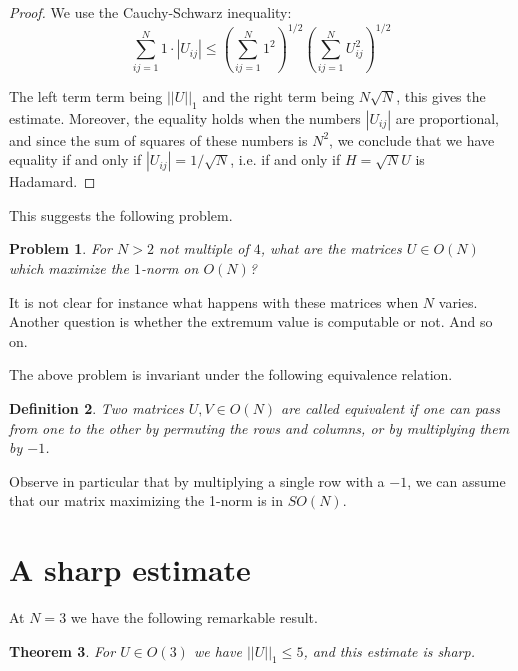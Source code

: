 \documentclass[12pt]{amsart}
\newtheorem{theorem}{Theorem}[section]
\newtheorem{definition}[theorem]{Definition}
\newtheorem{problem}[theorem]{Problem}
\begin{document}
\begin{proof}
We use the Cauchy-Schwarz inequality:
$$\sum_{ij=1}^N1\cdot |U_{ij}|\leq\left(\sum_{ij=1}^N1^2\right)^{1/2}\left(\sum_{ij=1}^NU_{ij}^2\right)^{1/2}$$

The left term term being $||U||_1$ and the right term being $N\sqrt{N}$, this gives the estimate. Moreover, the equality holds when the numbers $|U_{ij}|$ are proportional, and since the sum of squares of these numbers is $N^2$, we conclude that we have equality if and only if $|U_{ij}|=1/\sqrt{N}$, i.e. if and only if $H=\sqrt{N}U$ is Hadamard. 
\end{proof}

This suggests the following problem.

\begin{problem}
For $N>2$ not multiple of $4$, what are the matrices $U\in O(N)$ which maximize the $1$-norm on $O(N)$? 
\end{problem}

It is not clear for instance what happens with these matrices when $N$ varies. Another question is whether the extremum value is computable or not. And so on.

The above problem is invariant under the following equivalence relation.

\begin{definition}
Two matrices $U,V\in O(N)$ are called equivalent if one can pass from one to the other by permuting the rows and columns, or by multiplying them by $-1$.
\end{definition}

Observe in particular that by multiplying a single row with a $-1$, we can assume that our matrix maximizing the 1-norm is in $SO(N)$.

\section{A sharp estimate}

At $N=3$ we have the following remarkable result.

\begin{theorem}
For $U\in O(3)$ we have $||U||_1\leq 5$, and this estimate is sharp.
\end{theorem}
\end{document}
